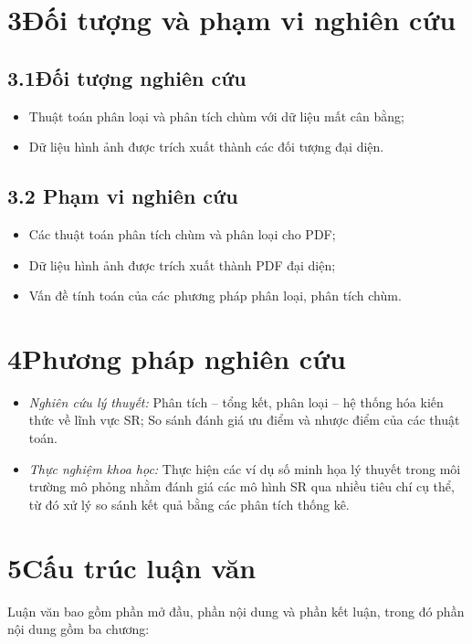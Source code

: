 \documentclass[a4paper,oneside]{book} %
\theoremstyle{plain}
\theoremstyle{plain}
\theoremstyle{nonumberplain}
\begin{document}
	\section*{3\quad Đối tượng và phạm vi nghiên cứu}

\subsection*{3.1\quad Đối tượng nghiên cứu}
\begin{itemize}
	\item[--] Thuật toán phân loại và phân tích chùm với dữ liệu mất cân bằng;
	\item[--] Dữ liệu hình ảnh được trích xuất thành các đối tượng đại diện.
\end{itemize}


\subsection*{3.2 \quad Phạm vi nghiên cứu}
\begin{itemize}
	\item[--] Các thuật toán phân tích chùm và phân loại cho PDF;
	\item[--] Dữ liệu hình ảnh được trích xuất thành PDF đại diện;
	\item[--] Vấn đề tính toán của các phương pháp phân loại, phân tích chùm. 
\end{itemize}



\section*{4\quad Phương pháp nghiên cứu}

\begin{itemize}
	\item[--] {\it Nghiên cứu lý thuyết:} Phân tích -- tổng kết, phân loại  -- hệ thống hóa kiến thức về lĩnh vực SR; So sánh đánh giá ưu điểm và nhược điểm của các thuật toán.
	\item[--] {\it Thực nghiệm khoa học:} Thực hiện các ví dụ số minh họa lý thuyết trong môi trường mô phỏng nhằm đánh giá các mô hình SR qua nhiều tiêu chí cụ thể,   từ đó xử lý so sánh kết quả bằng các phân tích thống kê.
\end{itemize}

\section*{5\quad Cấu trúc luận văn}
 Luận văn bao gồm phần mở đầu, phần nội dung và phần kết luận, trong đó phần nội dung  gồm ba chương:
\end{document}
